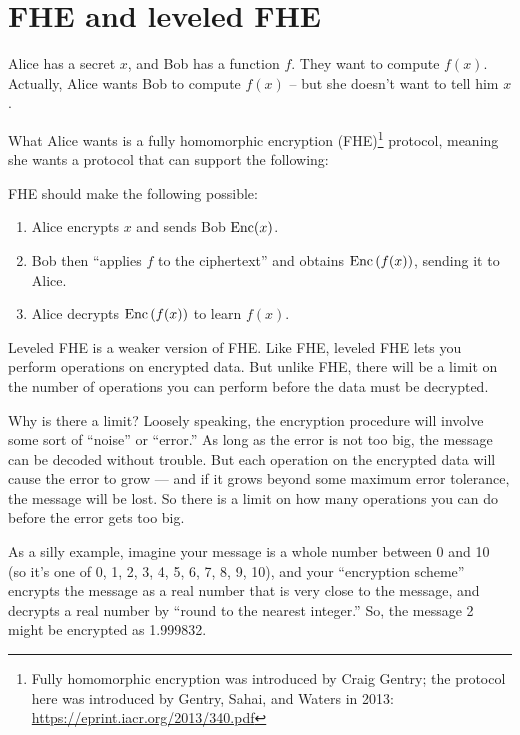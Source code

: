 \section{FHE and leveled FHE}\label{fhe-intro}

Alice has a secret $x$, and Bob has a function $f$. They want to
compute $f(x)$. Actually, Alice wants Bob to compute $f(x)$ -- but
she doesn't want to tell him $x$.

What Alice wants is a \alert{fully homomorphic encryption (FHE)}\footnote{Fully
homomorphic encryption was introduced by Craig Gentry;
the protocol here was introduced by Gentry, Sahai, and Waters in 2013: \url{https://eprint.iacr.org/2013/340.pdf}}
protocol,
meaning she wants a protocol that can support the following:

\begin{goal}{}{}
FHE should make the following possible:
\begin{enumerate}
\item Alice encrypts $x$ and sends Bob $\operatorname{Enc}(x)$.
\item Bob then ``applies $f$ to the ciphertext'' and obtains
  $\operatorname{Enc}\left( f(x) \right)$, sending it to Alice.
\item Alice decrypts $\operatorname{Enc}\left( f(x) \right)$ to learn $f(x)$.
\end{enumerate}
\end{goal}

\alert{Leveled FHE} is a weaker version of FHE. Like FHE, leveled FHE
lets you perform operations on encrypted data. But unlike FHE, there
will be a limit on the number of operations you can perform before the
data must be decrypted.

Why is there a limit? Loosely speaking, the encryption procedure will
involve some sort of ``noise'' or ``error.'' As long as the error is not
too big, the message can be decoded without trouble. But each operation
on the encrypted data will cause the error to grow --- and if it grows
beyond some maximum error tolerance, the message will be lost. So there
is a limit on how many operations you can do before the error gets too
big.

As a silly example, imagine your message is a whole number
between 0 and 10 (so it's one of 0, 1, 2, 3, 4, 5, 6, 7, 8, 9, 10), and
your ``encryption scheme'' encrypts the message as a real number that is
very close to the message, and decrypts a real number by ``round to the
nearest integer.'' So, the message 2 might be encrypted as 1.999832.

